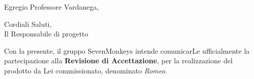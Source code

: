 \documentclass[10pt,a4paper,sans]{moderncv}        %
\begin{document}
\date{\emph{02 Luglio 2014}}
\opening{Egregio Professore Vardanega,}
\closing{Cordiali Saluti, \\ Il Responsabile di progetto	}
\makelettertitle

Con la presente, il gruppo SevenMonkeys intende comunicarLe ufficialmente la partecipazione alla \textbf{Revisione di Accettazione}, per la realizzazione del prodotto da Lei commissionato, denominato \textit{Romeo}.
\end{document}
